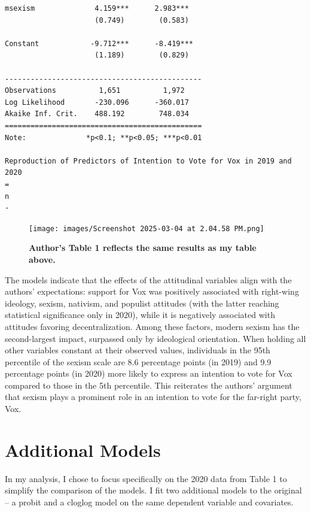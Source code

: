 \documentclass[
  letterpaper,
  DIV=11,
  numbers=noendperiod]{scrartcl}
\begin{document}
\begin{verbatim}
msexism              4.159***      2.983***   
                     (0.749)        (0.583)   
                                              
Constant            -9.712***      -8.419***  
                     (1.189)        (0.829)   
                                              
----------------------------------------------
Observations          1,651          1,972    
Log Likelihood       -230.096      -360.017   
Akaike Inf. Crit.    488.192        748.034   
==============================================
Note:              *p<0.1; **p<0.05; ***p<0.01

Reproduction of Predictors of Intention to Vote for Vox in 2019 and 2020
=
n
-
\end{verbatim}

\begin{figure}[H]

{\centering \texttt{[image: images/Screenshot 2025-03-04 at 2.04.58 PM.png]}

}

\caption{\textbf{Author's Table 1 reflects the same results as my table
above.}}

\end{figure}%

The models indicate that the effects of the attitudinal variables align
with the authors' expectations: support for Vox was positively
associated with right-wing ideology, sexism, nativism, and populist
attitudes (with the latter reaching statistical significance only in
2020), while it is negatively associated with attitudes favoring
decentralization. Among these factors, modern sexism has the
second-largest impact, surpassed only by ideological orientation. When
holding all other variables constant at their observed values,
individuals in the 95th percentile of the sexism scale are 8.6
percentage points (in 2019) and 9.9 percentage points (in 2020) more
likely to express an intention to vote for Vox compared to those in the
5th percentile. This reiterates the authors' argument that sexism plays
a prominent role in an intention to vote for the far-right party, Vox.

\section{Additional Models}\label{additional-models}

In my analysis, I chose to focus specifically on the 2020 data from
Table 1 to simplify the comparison of the models. I fit two additional
models to the original -- a probit and a cloglog model on the same
dependent variable and covariates.
\end{document}
